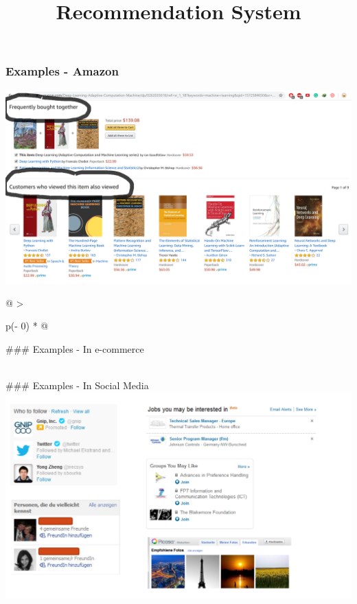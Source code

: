 \documentclass[
]{article}
\title{Recommendation System}
\author{}
\date{\vspace{-2.5em}}
\begin{document}
\maketitle

\hypertarget{examples---amazon}{%
\subsubsection{Examples - Amazon}\label{examples---amazon}}

\includegraphics{images/rs1.png}

\begin{longtable}[]{@{}
  >{\raggedright\arraybackslash}p{(\columnwidth - 0\tabcolsep) * }@{}}
\toprule
\begin{minipage}[b]{\linewidth}\raggedright
\#\#\# Examples - In e-commerce
\end{minipage} \\
\midrule
\endhead
\#\#\# Examples - In Social Media \\
\includegraphics{images/rs3.png} \\
\bottomrule
\end{longtable}
\end{document}
